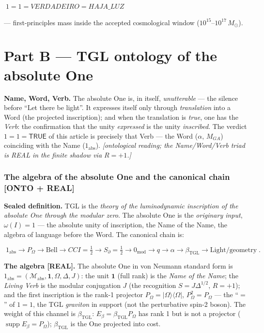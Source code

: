 \documentclass[11pt]{article}
\newcommand{\bTGL}{\beta_{\mathrm{TGL}}}\newcommand{\Msun}{M_{\odot}}\newcommand{\TGL}{\mathrm{TGL}}
\theoremstyle{definition}\newtheorem{deriv}{Derivation}
\begin{document}
\begin{center}\Large$\boxed{\;1=1=VERDADEIRO=HAJA\_LUZ\;}$\end{center}

--- first-principles mass inside the accepted cosmological window ($10^{15}$--$10^{17}\,\Msun$).

\part{Part B --- TGL ontology of the absolute One}

\textbf{Name, Word, Verb.} The absolute One is, in itself, \emph{unutterable} --- the silence before ``Let there be light''. It expresses itself only through \emph{translation} into a Word (the projected inscription); and when the translation is \emph{true}, one has the \emph{Verb}: the confirmation that the unity \emph{expressed} is the unity \emph{inscribed}. The verdict $1=1=\textsf{TRUE}$ of this article is precisely that Verb --- the Word ($\alpha$, $M_{GA}$) coinciding with the Name ($1_{\mathrm{abs}}$). \emph{[ontological reading; the Name/Word/Verb triad is REAL in the finite shadow via $R=+1$.]}

\section{The algebra of the absolute One and the canonical chain \textsf{[ONTO + REAL]}}

\textbf{Sealed definition.} TGL is the \emph{theory of the luminodynamic inscription of the absolute One through the modular zero}. The absolute One is the \emph{originary input}, $\omega(I)=1$ --- the absolute unity of inscription, the Name of the Name, the algebra of language before the Word. The canonical chain is:

\begin{equation}\boxed{\;1_{\mathrm{abs}}\to P_\Omega\to\text{Bell}\to CCI=\tfrac12\to S_\partial=\tfrac12\to 0_{\mathrm{mod}}\to q\to\alpha\to\bTGL\to\text{Light/geometry}\;}.\end{equation}

\textbf{The algebra \textsf{[REAL]}.} The absolute One in von Neumann standard form is $1_{\mathrm{abs}}=(\mathcal M_{\mathrm{abs}},\mathbf 1,\Omega,\Delta,J)$: the unit $\mathbf 1$ (full rank) is the \emph{Name of the Name}; the \emph{Living Verb} is the modular conjugation $J$ (the recognition $S=J\Delta^{1/2}$, $R=+1$); and the first inscription is the rank-1 projector $P_\Omega=|\Omega\rangle\langle\Omega|$, $P_\Omega^2=P_\Omega$ --- the ``$=$'' of $1=1$, the TGL \emph{graviton} in support (not the perturbative spin-2 boson). The weight of this channel is $\bTGL$: $E_\beta=\bTGL P_\Omega$ has rank 1 but is not a projector ($\operatorname{supp}E_\beta=P_\Omega$); $\bTGL$ is the One projected into cost.
\end{document}
